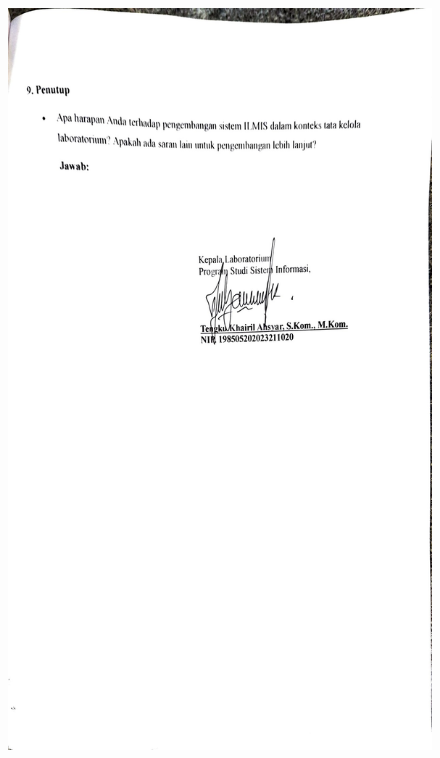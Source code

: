 \begin{figure}[h]
	\centering
	\includegraphics[width=0.82\linewidth]{konten/gambar/wawancara/wawancara_5.jpg}

	\label{fig:hasil-wawancara}
\end{figure}


